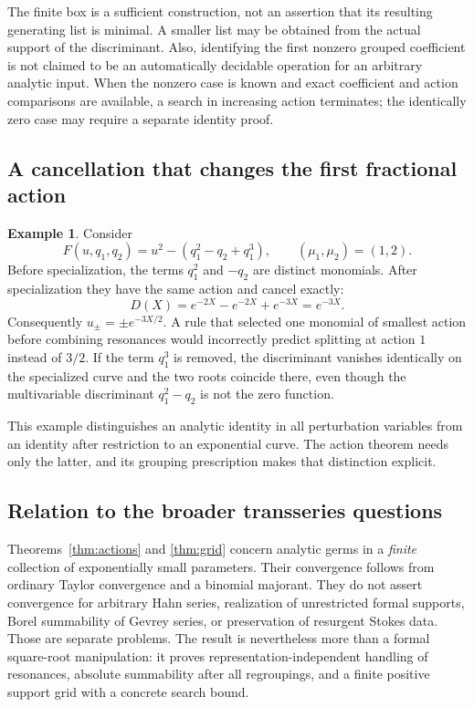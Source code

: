 \documentclass[11pt,a4paper]{article}
\theoremstyle{definition}
\newtheorem{example}[theorem]{Example}
\theoremstyle{remark}
\begin{document}
The finite box is a sufficient construction, not an assertion that its
resulting generating list is minimal. A smaller list may be obtained
from the actual support of the discriminant. Also, identifying the first
nonzero grouped coefficient is not claimed to be an automatically
decidable operation for an arbitrary analytic input. When the nonzero
case is known and exact coefficient and action comparisons are available,
a search in increasing action terminates; the identically zero case may
require a separate identity proof.

\subsection{A cancellation that changes the first fractional action}
\begin{example}\label{ex:resonance}
Consider
\[
 F(u,q_1,q_2)=u^2-(q_1^2-q_2+q_1^3),
 \qquad (\mu_1,\mu_2)=(1,2).
\]
Before specialization, the terms $q_1^2$ and $-q_2$ are distinct monomials.
After specialization they have the same action and cancel exactly:
\[
 D(X)=e^{-2X}-e^{-2X}+e^{-3X}=e^{-3X}.
\]
Consequently $u_\pm=\pm e^{-3X/2}$. A rule that selected one monomial of
smallest action before combining resonances would incorrectly predict
splitting at action $1$ instead of $3/2$.
If the term $q_1^3$ is removed, the discriminant vanishes identically on
the specialized curve and the two roots coincide there, even though the
multivariable discriminant $q_1^2-q_2$ is not the zero function.
\end{example}

This example distinguishes an analytic identity in all perturbation
variables from an identity after restriction to an exponential curve.
The action theorem needs only the latter, and its grouping prescription
makes that distinction explicit.

\subsection{Relation to the broader transseries questions}
Theorems~\ref{thm:actions} and \ref{thm:grid} concern analytic germs in a
\emph{finite} collection of exponentially small parameters. Their
convergence follows from ordinary Taylor convergence and a binomial
majorant. They do not assert convergence for arbitrary Hahn series,
realization of unrestricted formal supports, Borel summability of
Gevrey series, or preservation of resurgent Stokes data. Those are
separate problems. The result is nevertheless more than a formal
square-root manipulation: it proves representation-independent handling
of resonances, absolute summability after all regroupings, and a finite
positive support grid with a concrete search bound.
\end{document}
